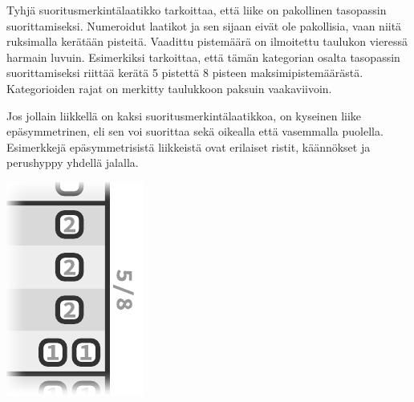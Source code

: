 \documentclass{article}
\begin{document}
\begin{minipage}[t]{0.8\textwidth} %
	\setlength{\parindent}{0em} %
	\setlength{\parskip}{.7em} %
	Tyhjä suoritusmerkintälaatikko
	tarkoittaa, että liike on pakollinen tasopassin suorittamiseksi.
	Numeroidut laatikot
	 ja %
	sen sijaan eivät ole pakollisia, vaan niitä ruksimalla
	kerätään pisteitä. Vaadittu pistemäärä on ilmoitettu taulukon vieressä
	harmain luvuin. Esimerkiksi
	tarkoittaa, että tämän kategorian osalta tasopassin suorittamiseksi riittää
	kerätä 5 pistettä 8 pisteen maksimipistemäärästä. Kategorioiden rajat on
	merkitty taulukkoon paksuin vaakaviivoin.

	Jos jollain liikkellä on kaksi suoritusmerkintälaatikkoa, on kyseinen liike
	epäsymmetrinen, eli sen voi suorittaa sekä oikealla että vasemmalla
	puolella. Esimerkkejä epäsymmetrisistä liikkeistä ovat erilaiset ristit,
	käännökset ja perushyppy yhdellä jalalla.
\end{minipage}%
\begin{minipage}[t]{0.2\textwidth} %
	\vspace*{0em}
	\raggedleft
	\includegraphics[scale=.75]{kategoriaesimerkki.pdf}
\end{minipage}%
\end{document}

